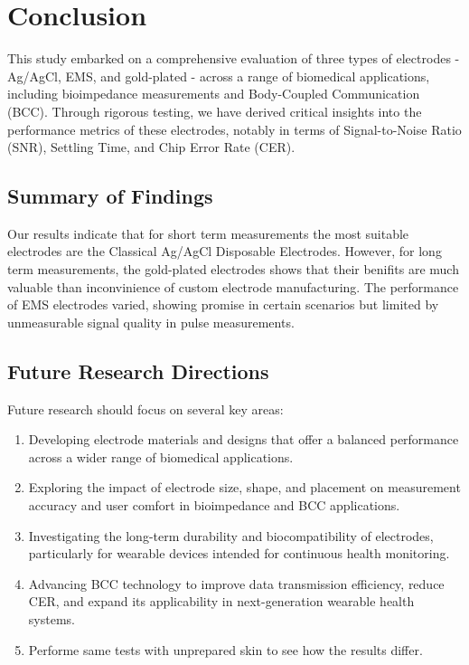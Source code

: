 \documentclass[conference]{IEEEtran}
\begin{document}
\section{Conclusion}

This study embarked on a comprehensive evaluation of three types of electrodes - Ag/AgCl, EMS, and gold-plated - across a range of biomedical applications, including bioimpedance measurements and Body-Coupled Communication (BCC). Through rigorous testing, we have derived critical insights into the performance metrics of these electrodes, notably in terms of Signal-to-Noise Ratio (SNR), Settling Time, and Chip Error Rate (CER).

\subsection{Summary of Findings}
Our results indicate that for short term measurements the most suitable electrodes are the Classical Ag/AgCl Disposable Electrodes. However, for long term measurements, the gold-plated electrodes shows that their benifits are much valuable than inconvinience of custom electrode manufacturing. The performance of EMS electrodes varied, showing promise in certain scenarios but limited by unmeasurable signal quality in pulse measurements.


\subsection{Future Research Directions}
Future research should focus on several key areas:
\begin{enumerate}
    \item Developing electrode materials and designs that offer a balanced performance across a wider range of biomedical applications.
    \item Exploring the impact of electrode size, shape, and placement on measurement accuracy and user comfort in bioimpedance and BCC applications.
    \item Investigating the long-term durability and biocompatibility of electrodes, particularly for wearable devices intended for continuous health monitoring.
    \item Advancing BCC technology to improve data transmission efficiency, reduce CER, and expand its applicability in next-generation wearable health systems.
    \item Performe same tests with unprepared skin to see how the results differ.
\end{enumerate}
\end{document}
